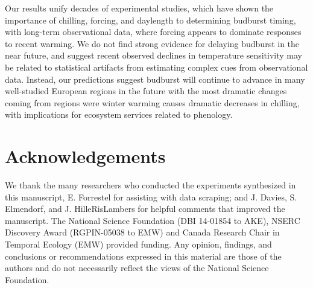 \documentclass{article}
\begin{document}
 \par Our results unify decades of experimental studies, which have shown the importance of chilling, forcing, and daylength to determining budburst timing, with long-term observational data, where forcing appears to dominate responses to recent warming. We do not find strong evidence for delaying budburst in the near future, and suggest recent observed declines in temperature sensitivity may be related to statistical artifacts from estimating complex cues from observational data. Instead, our predictions suggest budburst will continue to advance in many well-studied European regions in the future with the most dramatic changes coming from regions were winter warming causes dramatic decreases in chilling, with implications for ecosystem services related to phenology. %
 



\section*{Acknowledgements}
We thank the many researchers who conducted the experiments synthesized in this manuscript, E. Forrestel for assisting with data scraping; and J. Davies, S. Elmendorf, and J. HilleRisLambers for helpful comments that improved the manuscript. The National Science Foundation (DBI 14-01854 to AKE), NSERC Discovery Award (RGPIN-05038 to EMW) and Canada Research Chair in Temporal Ecology (EMW) provided funding. Any opinion, findings, and conclusions or recommendations expressed in this material are those of the authors and do not necessarily reflect the views of the National Science Foundation.
\end{document}
